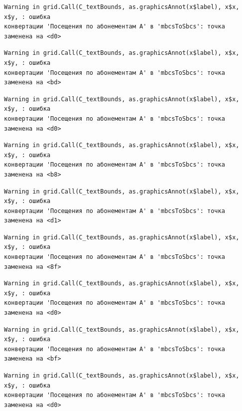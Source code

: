 \documentclass[
  letterpaper,
  DIV=11,
  numbers=noendperiod]{scrreprt}
\begin{document}
\begin{verbatim}
Warning in grid.Call(C_textBounds, as.graphicsAnnot(x$label), x$x, x$y, : ошибка
конвертации 'Посещения по абонементам А' в 'mbcsToSbcs': точка заменена на <d0>
\end{verbatim}

\begin{verbatim}
Warning in grid.Call(C_textBounds, as.graphicsAnnot(x$label), x$x, x$y, : ошибка
конвертации 'Посещения по абонементам А' в 'mbcsToSbcs': точка заменена на <bd>
\end{verbatim}

\begin{verbatim}
Warning in grid.Call(C_textBounds, as.graphicsAnnot(x$label), x$x, x$y, : ошибка
конвертации 'Посещения по абонементам А' в 'mbcsToSbcs': точка заменена на <d0>
\end{verbatim}

\begin{verbatim}
Warning in grid.Call(C_textBounds, as.graphicsAnnot(x$label), x$x, x$y, : ошибка
конвертации 'Посещения по абонементам А' в 'mbcsToSbcs': точка заменена на <b8>
\end{verbatim}

\begin{verbatim}
Warning in grid.Call(C_textBounds, as.graphicsAnnot(x$label), x$x, x$y, : ошибка
конвертации 'Посещения по абонементам А' в 'mbcsToSbcs': точка заменена на <d1>
\end{verbatim}

\begin{verbatim}
Warning in grid.Call(C_textBounds, as.graphicsAnnot(x$label), x$x, x$y, : ошибка
конвертации 'Посещения по абонементам А' в 'mbcsToSbcs': точка заменена на <8f>
\end{verbatim}

\begin{verbatim}
Warning in grid.Call(C_textBounds, as.graphicsAnnot(x$label), x$x, x$y, : ошибка
конвертации 'Посещения по абонементам А' в 'mbcsToSbcs': точка заменена на <d0>
\end{verbatim}

\begin{verbatim}
Warning in grid.Call(C_textBounds, as.graphicsAnnot(x$label), x$x, x$y, : ошибка
конвертации 'Посещения по абонементам А' в 'mbcsToSbcs': точка заменена на <bf>
\end{verbatim}

\begin{verbatim}
Warning in grid.Call(C_textBounds, as.graphicsAnnot(x$label), x$x, x$y, : ошибка
конвертации 'Посещения по абонементам А' в 'mbcsToSbcs': точка заменена на <d0>
\end{verbatim}
\end{document}
